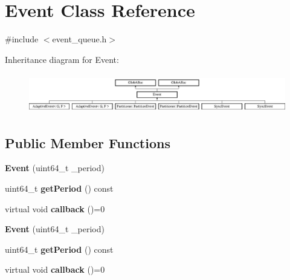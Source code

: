 \hypertarget{classEvent}{\section{Event Class Reference}
\label{classEvent}
}


{\ttfamily \#include $<$event\-\_\-queue.\-h$>$}

Inheritance diagram for Event\-:\begin{figure}[H]
\begin{center}
\leavevmode
\includegraphics[height=1.728395cm]{classEvent}
\end{center}
\end{figure}
\subsection*{Public Member Functions}
\begin{DoxyCompactItemize}
\item 
\hypertarget{classEvent_a30314db1ee1d302e652b4fbdc6fd014f}{{\bfseries Event} (uint64\-\_\-t \-\_\-period)}\label{classEvent_a30314db1ee1d302e652b4fbdc6fd014f}

\item 
\hypertarget{classEvent_ab04472aa7d4a60a2c52edae3ed12cef2}{uint64\-\_\-t {\bfseries get\-Period} () const }\label{classEvent_ab04472aa7d4a60a2c52edae3ed12cef2}

\item 
\hypertarget{classEvent_a625651166eae427187cdc0c351a41315}{virtual void {\bfseries callback} ()=0}\label{classEvent_a625651166eae427187cdc0c351a41315}

\item 
\hypertarget{classEvent_a30314db1ee1d302e652b4fbdc6fd014f}{{\bfseries Event} (uint64\-\_\-t \-\_\-period)}\label{classEvent_a30314db1ee1d302e652b4fbdc6fd014f}

\item 
\hypertarget{classEvent_ab04472aa7d4a60a2c52edae3ed12cef2}{uint64\-\_\-t {\bfseries get\-Period} () const }\label{classEvent_ab04472aa7d4a60a2c52edae3ed12cef2}

\item 
\hypertarget{classEvent_a625651166eae427187cdc0c351a41315}{virtual void {\bfseries callback} ()=0}\label{classEvent_a625651166eae427187cdc0c351a41315}

\end{DoxyCompactItemize}
